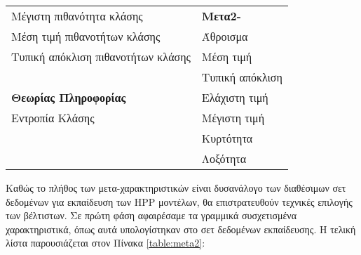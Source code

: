 \begin{itemize}
\begin{table}[!htb]
\begin{center}
{\begin{tabular}{ |l|l| }
					Μέγιστη πιθανότητα κλάσης & \textbf{Μετα2-}\\
					Μέση τιμή πιθανοτήτων κλάσης& Άθροισμα\\
					Τυπική απόκλιση πιθανοτήτων κλάσης & Μέση τιμή\\
					& Τυπική απόκλιση\\
					\textbf{Θεωρίας Πληροφορίας}  & Ελάχιστη τιμή\\
					Εντροπία Κλάσης & Μέγιστη τιμή\\
				    &	 Κυρτότητα\\
				    & Λοξότητα\\				
					\hline
				\end{tabular}}   
			\end{center}
				\end{table}
				
Καθώς το πλήθος των μετα-χαρακτηριστικών είναι δυσανάλογο των διαθέσιμων σετ δεδομένων για εκπαίδευση των \gls{HPP} μοντέλων, θα επιστρατευθούν τεχνικές επιλογής των βέλτιστων. Σε πρώτη φάση αφαιρέσαμε τα γραμμικά συσχετισμένα χαρακτηριστικά, όπως αυτά υπολογίστηκαν στο σετ δεδομένων εκπαίδευσης. H τελική λίστα παρουσιάζεται στον Πίνακα \ref{table:meta2}:	


\end{itemize}
